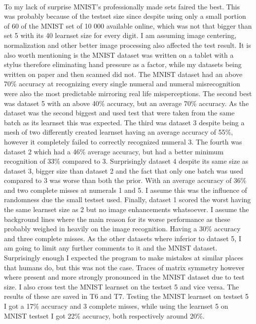 \documentclass{article}
\begin{document}
	\paragraph{}
	To my lack of surprise MNIST’s professionally made sets faired the best. This was probably because of the testset size since despite using only a small portion of 60 of the MNIST set of 10 000 available online, which was not that bigger than set 5 with its 40 learnset size for every digit. I am assuming image centering, normalization and other better image processing also affected the test result. 
	It is also worth mentioning is the MNIST dataset was written on a tablet with a stylus therefore eliminating hand pressure as a factor, while my datasets being written on paper and then scanned did not.
	The MNIST dataset had an above 70\% accuracy at recognizing every single numeral and numeral misrecognition were also the most predictable mirroring real life misperceptions.
	The second best was dataset 5 with an above 40\% accuracy, but an average 70\% accuracy. As the dataset was the second biggest and used test that were taken from the same batch as its learnset this was expected.
	The third was dataset 3 despite being a mesh of two differently created learnset having an average accuracy of 55\%, however it completely failed to correctly recognized numeral 3.
	The fourth was dataset 2 which had a 46\% average accuracy, but had a better minimum recognition of 33\% compared to 3.
	Surprisingly dataset 4 despite its same size as dataset 3, bigger size than dataset 2 and the fact that only one batch was used compared to 3 was worse than both the prior. With an average accuracy of 36\% and two complete misses at numerals 1 and 5. I assume this was the influence of randomness due the small testset used.
	Finally, dataset 1 scored the worst having the same learnset size as 2 but no image enhancements whatsoever. I assume the background lines where the main reason for its worse performance as these probably weighed in heavily on the image recognition. Having a 30\% accuracy and three complete misses.
	As the other datasets where inferior to dataset 5, I am going to limit any further comments to it and the MNIST dataset.
	Surprisingly enough I expected the program to make mistakes at similar places that humans do, but this was not the case. 
	Traces of matrix symmetry however where present and more strongly pronounced in the MNIST dataset due to test size.
	I also cross test the MNIST learnset on the testset 5 and vice versa. The results of these are saved in T6 and T7.
	Testing the MNIST learnset on testset 5 I got a 17\% accuracy and 3 complete misses, while using the learnset 5 on MNIST testset I got 22\% accuracy, both respectively around 20\%.
\end{document}

